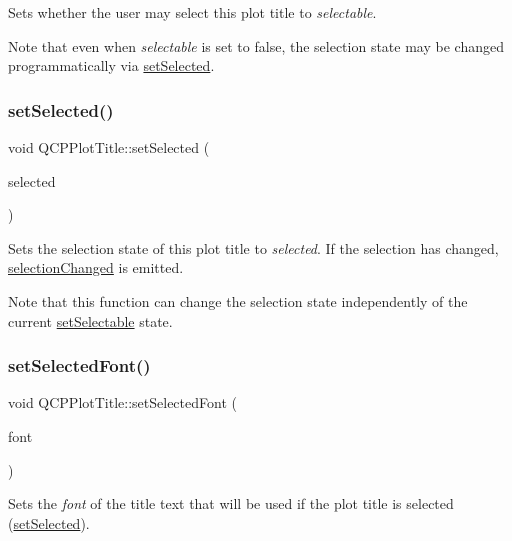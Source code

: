 Sets whether the user may select this plot title to {\itshape selectable}.

Note that even when {\itshape selectable} is set to {\ttfamily false}, the selection state may be changed programmatically via \hyperlink{class_q_c_p_plot_title_a8d441a889d371307df86f1ab7687a333}{set\+Selected}. \hypertarget{class_q_c_p_plot_title_a8d441a889d371307df86f1ab7687a333}{}\label{class_q_c_p_plot_title_a8d441a889d371307df86f1ab7687a333} 
\subsubsection{\texorpdfstring{set\+Selected()}{setSelected()}}
{\footnotesize\ttfamily void Q\+C\+P\+Plot\+Title\+::set\+Selected (\begin{DoxyParamCaption}\item[{bool}]{selected }\end{DoxyParamCaption})}

Sets the selection state of this plot title to {\itshape selected}. If the selection has changed, \hyperlink{class_q_c_p_plot_title_a3a01ede2da3b0b5eda33aa5274cc3523}{selection\+Changed} is emitted.

Note that this function can change the selection state independently of the current \hyperlink{class_q_c_p_plot_title_a8866b07b9fa14877d4cefbf38406c5dd}{set\+Selectable} state. \hypertarget{class_q_c_p_plot_title_a5245980ead999ceed51dbe702d0e3131}{}\label{class_q_c_p_plot_title_a5245980ead999ceed51dbe702d0e3131} 
\subsubsection{\texorpdfstring{set\+Selected\+Font()}{setSelectedFont()}}
{\footnotesize\ttfamily void Q\+C\+P\+Plot\+Title\+::set\+Selected\+Font (\begin{DoxyParamCaption}\item[{const Q\+Font \&}]{font }\end{DoxyParamCaption})}

Sets the {\itshape font} of the title text that will be used if the plot title is selected (\hyperlink{class_q_c_p_plot_title_a8d441a889d371307df86f1ab7687a333}{set\+Selected}).

